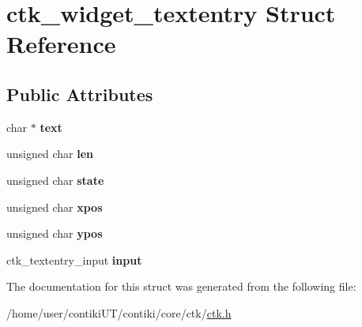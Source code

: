 \hypertarget{structctk__widget__textentry}{}\section{ctk\+\_\+widget\+\_\+textentry Struct Reference}
\label{structctk__widget__textentry}
\subsection*{Public Attributes}
\begin{DoxyCompactItemize}
\item 
\hypertarget{structctk__widget__textentry_a5de6ff6721c6532d5f0a0a46ed3e8c38}{}char $\ast$ {\bfseries text}\label{structctk__widget__textentry_a5de6ff6721c6532d5f0a0a46ed3e8c38}

\item 
\hypertarget{structctk__widget__textentry_aa4b07ec495b1d3e2a6a164d868ac9874}{}unsigned char {\bfseries len}\label{structctk__widget__textentry_aa4b07ec495b1d3e2a6a164d868ac9874}

\item 
\hypertarget{structctk__widget__textentry_a3f4966935fb7e645ae5b8ea13b28940f}{}unsigned char {\bfseries state}\label{structctk__widget__textentry_a3f4966935fb7e645ae5b8ea13b28940f}

\item 
\hypertarget{structctk__widget__textentry_ac5b25dbdf25b5c300a4a7c0644a2b27c}{}unsigned char {\bfseries xpos}\label{structctk__widget__textentry_ac5b25dbdf25b5c300a4a7c0644a2b27c}

\item 
\hypertarget{structctk__widget__textentry_ad8e10cb469776f33b54eb8bd453ad4c8}{}unsigned char {\bfseries ypos}\label{structctk__widget__textentry_ad8e10cb469776f33b54eb8bd453ad4c8}

\item 
\hypertarget{structctk__widget__textentry_a1edc4bf84ebd629db04767ad4a041a6c}{}ctk\+\_\+textentry\+\_\+input {\bfseries input}\label{structctk__widget__textentry_a1edc4bf84ebd629db04767ad4a041a6c}

\end{DoxyCompactItemize}


The documentation for this struct was generated from the following file\+:\begin{DoxyCompactItemize}
\item 
/home/user/contiki\+U\+T/contiki/core/ctk/\hyperlink{ctk_8h}{ctk.\+h}\end{DoxyCompactItemize}
